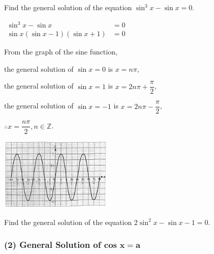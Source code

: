\documentclass{report}
\begin{document}
\begin{question}
	Find the general solution of the equation $\sin ^3 x-\sin x=0$.
	
	\sol{}
	\vspace{-1em}
	\begin{multicols}{2}
		\noindent $\begin{aligned} \sin ^3 x-\sin x & =0 \\ \sin x(\sin x-1)(\sin x+1) & =0\end{aligned}$
		    
		\noindent From the graph of the sine function,
		
		\vspace{-1em}
		\noindent the general solution of $\sin x=0$ is $x=n\pi$,
		
		\vspace{-1em}
		\noindent the general solution of $\sin x=1$ is $x=2n\pi+\dfrac{\pi}{2}$,
		
		\vspace{-1em}
		\noindent the general solution of $\sin x=-1$ is $x=2n\pi-\dfrac{\pi}{2}$,
		
		\vspace{-1em}
		\noindent $\therefore x=\dfrac{n\pi}{2}, n \in \mathbb{Z}$.
		\vspace{5em}
		
		\includegraphics[width=0.4\textwidth]{assets/11-11.jpg}
	\end{multicols}
\end{question}

Find the general solution of the equation $2 \sin ^2 x-\sin x-1=0$.

\subsubsection*{(2) General Solution of $\mathbf{\text{cos } x=a}$}
\end{document}
